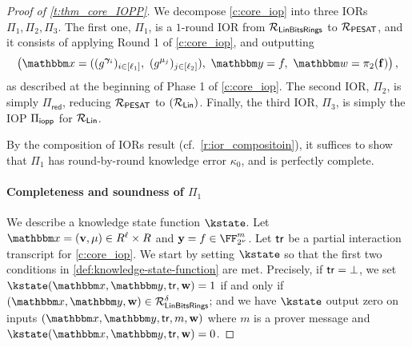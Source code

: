 \documentclass[11pt,letterpaper,usenames,dvipsnames]{article}
\begin{document}
\begin{proof}[Proof of \cref{t:thm_core_IOPP}]
%
We decompose \cref{c:core_iop} into three IORs $\Pi_1, \Pi_2, \Pi_3$.  The first one, $\Pi_1$, is a $1$-round IOR from $\mathcal{R}_{\mathsf{LinBitsRings}}$ to $\mathcal{R}_{\mathsf{PESAT}}$, and it consists of applying Round 1 of \cref{c:core_iop}, and outputting $$\left(\inp=((g^{\bm{\gamma}_i})_{i \in [\codedim_1]},\ (g^{\mu_j})_{j\in [\codedim_2]}),\  \oracle= f, \ \wit=\picomfield(\bff)\right),$$ as described at the beginning of Phase 1 of \cref{c:core_iop}. The second IOR, $\Pi_2$, is simply $\Pi_{\mathsf{red}}$, reducing $\mathcal{R}_{\mathsf{PESAT}}$ to $\left(\mathcal{R}_{\mathsf{Lin}}\right)$. Finally, the third IOR, $\Pi_3$, is simply the IOP $\Pi_{\mathsf{iopp}}$ for $\mathcal{R}_{\mathsf{Lin}}$.


By the composition of IORs result (cf.\ \cref{r:ior_compositoin}), it suffices to show that $\Pi_1$ has round-by-round knowledge error $\kappa_0$, and is perfectly complete. 





\paragraph{Completeness and soundness of $\Pi_1$}

We describe a knowledge state function $\kstate$. Let $\inp=(\vv,\mu)\in \evalfield^{\codedim} \times \evalfield$ and  $\yy=f\in \comfield^{\codelength}$. Let $\mathsf{tr}$ be a partial interaction transcript for \cref{c:core_iop}. We start by setting $\kstate$ so that the first two conditions in \cref{def:knowledge-state-function} are met. Precisely, if   $\mathsf{tr}=\bot$, we set $\kstate(\inp,\oracle,\tr,\ww) = 1$ if and only if $(\inp, \oracle, \ww)\in \LinBitsDual^{\delta}$; and we have $\kstate$ output zero on inputs  $(\inp,\oracle,\tr,m,\ww)$ where $m$ is a prover  message  and $\kstate(\inp,\oracle,\tr,\ww)=0$.


\end{proof}
\end{document}
